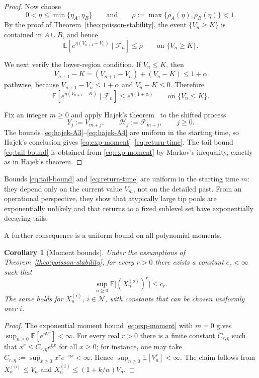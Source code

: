 \documentclass[a4paper,12pt,oneside,reqno]{amsart}
\newcommand{\Nodes}{{\mathcal N}}
\newcommand{\E}{{\mathbb E}}
\newcommand{\F}{{\mathcal F}}
\newcommand{\1}{{\mathbf 1}}
\newtheorem{cor}[theo]{Corollary}
\begin{document}
\begin{proof}
Now choose
\[
   0<\eta\le \min\{\eta_A,\eta_B\}
   \qquad\text{and}\qquad
   \rho:=\max\{\rho_A(\eta),\rho_B(\eta)\}<1.
\]
By the proof of Theorem~\ref{theo:poisson-stability}, the event $\{V_n\ge K\}$ is contained in $A\cup B$, and hence
\begin{equation}\label{eq:hajek-A3}
   \E[e^{\eta(V_{n+1}-V_n)}\mid \F_n]\le \rho
   \qquad\text{on }\{V_n\ge K\}.
\end{equation}

We next verify the lower-region condition. If $V_n\le K$, then
\[
   V_{n+1}-K
   = (V_{n+1}-V_n)+(V_n-K)
   \le 1+\alpha
\]
pathwise, because $V_{n+1}-V_n\le 1+\alpha$ and $V_n-K\le 0$. Therefore
\begin{equation}\label{eq:hajek-A4}
   \E[e^{\eta(V_{n+1}-K)}\mid \F_n]\le e^{\eta(1+\alpha)}
   \qquad\text{on }\{V_n\le K\}.
\end{equation}

Fix an integer $m\ge 0$ and apply Hajek's theorem~\cite[Theorem~2.3]{Hajek:82} to the shifted process
\[
   Y_j:=V_{m+j},
   \qquad
   \mathcal{H}_j:=\F_{m+j},
   \qquad j\ge 0.
\]
The bounds \eqref{eq:hajek-A3}--\eqref{eq:hajek-A4} are uniform in the starting time, so Hajek's conclusion gives \eqref{eq:exp-moment}--\eqref{eq:return-time}. The tail bound \eqref{eq:tail-bound} is obtained from \eqref{eq:exp-moment} by Markov's inequality, exactly as in Hajek's theorem.
\end{proof}

Bounds \eqref{eq:tail-bound} and \eqref{eq:return-time} are uniform in the starting time $m$: they depend only on the current value $V_m$, not on the detailed past. From an operational perspective, they show that atypically large tip pools are exponentially unlikely and that returns to a fixed sublevel set have exponentially decaying tails.

A further consequence is a uniform bound on all polynomial moments.

\begin{cor}[Moment bounds]\label{cor:moments}
Under the assumptions of Theorem~\ref{theo:poisson-stability}, for every $r>0$ there exists a constant $c_r<\infty$ such that
\[
   \sup_{n\ge0}\E\bigl[(X_n^{(o)})^r\bigr] \le c_r.
\]
The same holds for $X_n^{(i)}$, $i\in\Nodes$, with constants that can be chosen uniformly over $i$.
\end{cor}

\begin{proof}
The exponential moment bound \eqref{eq:exp-moment} with $m=0$ gives $\sup_{n\ge0}\E[e^{\eta V_n}]<\infty$. For every real $r>0$ there is a finite constant $C_{r,\eta}$ such that $x^r\le C_{r,\eta}e^{\eta x}$ for all $x\ge0$; for instance, one may take $C_{r,\eta}:=\sup_{x\ge0}x^r e^{-\eta x}<\infty$. Hence $\sup_{n\ge0}\E[V_n^r]<\infty$. The claim follows from $X_n^{(o)}\le V_n$ and $X_n^{(i)}\le(1+k/\alpha)V_n$.
\end{proof}
\end{document}
